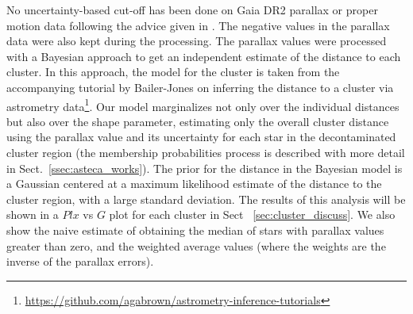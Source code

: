 \documentclass[draft]{aa}
\begin{document}
No uncertainty-based cut-off has been done on Gaia DR2 parallax or proper
motion data following the advice given in \cite{Luri_2018}. The negative values
in the parallax data were also kept during the processing. The parallax values
were processed with a Bayesian approach to get an independent estimate of the
distance to each cluster. In this approach, the model for the cluster is
taken from the accompanying tutorial by Bailer-Jones on inferring the distance
to a cluster via astrometry
data\footnote{
\url{https://github.com/agabrown/astrometry-inference-tutorials}}.
Our model marginalizes not only over the individual distances but also over the
shape parameter, estimating only the overall cluster distance using the
parallax value and its uncertainty for each star in the decontaminated cluster
region (the membership probabilities process is described with more detail in
Sect.~\ref{ssec:asteca_works}). The prior for the distance in the Bayesian
model is a Gaussian centered at a maximum likelihood estimate of the distance
to the cluster region, with a large standard deviation. The results of
this analysis will be shown in a $Plx$ vs $G$ plot for each cluster in Sect~
\ref{sec:cluster_discuss}. We also show the naive estimate of obtaining the
median of stars with parallax values greater than zero, and the weighted
average values (where the weights are the inverse of the parallax errors).

\end{document}
